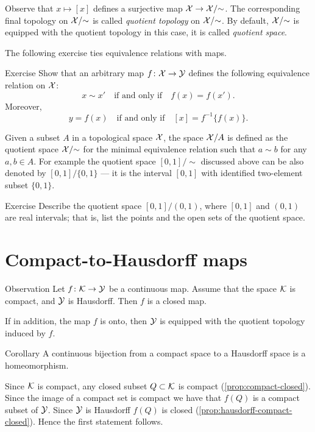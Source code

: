 Observe that $x\mapsto [x]$ defines a surjective map $\mathcal{X}\to \mathcal{X}/{\sim}$.
The corresponding final topology on $\mathcal{X}/{\sim}$ is called \emph{quotient topology} on $\mathcal{X}/{\sim}$.
By default, $\mathcal{X}/{\sim}$ is equipped with the quotient topology
in this case, it is called \emph{quotient space}.

The following exercise ties equivalence relations with maps.

\begin{thm}{Exercise}\label{ex:eq-relation-f}
Show that an arbitrary map $f\colon\mathcal{X}\to \mathcal{Y}$ defines the following equivalence relation on $\mathcal{X}$:
\[x\sim x'\quad\text{if and only if}\quad f(x)=f(x').\]
Moreover,
\[y=f(x)\quad\text{if and only if}\quad [x]=f^{-1}\{f(x)\}.\]
\end{thm}

Given a subset $A$ in a topological space $\mathcal{X}$, the space $\mathcal{X}/A$ is defined as the quotient space $\mathcal{X}/{\sim}$ for the minimal equivalence relation such that $a\sim b$ for any $a,b\in A$.
For example the quotient space $[0,1]/{\sim}$ discussed above can be also denoted by $[0,1]/\{0,1\}$ --- it is the interval $[0,1]$ with identified two-element subset $\{0,1\}$.

\begin{thm}{Exercise}\label{ex:[0,1]/(0,1)}
Describe the quotient space $[0,1]/(0,1)$, where $[0,1]$ and $(0,1)$ are real intervals;
that is, list the points and the open sets of the quotient space.
\end{thm}

\section{Compact-to-Hausdorff maps}

\begin{thm}{Observation}\label{obs:compact-to-hausdorff}
Let $f\colon\mathcal{K}\to\mathcal{Y}$ be a continuous map.
Assume that the space $\mathcal{K}$ is compact, and $\mathcal{Y}$ is Hausdorff.
Then $f$ is a closed map.

If in addition, the map $f$ is onto, then $\mathcal{Y}$ is equipped with the quotient topology induced by $f$. 
\end{thm}

\begin{thm}{Corollary}
A continuous bijection from a compact space to a Hausdorff space is a homeomorphism.
\end{thm}


Since $\mathcal{K}$ is compact, any closed subset $Q\subset \mathcal{K}$ is compact (\ref{prop:compact-closed}).
Since the image of a compact set is compact we have that $f(Q)$ is a compact subset of $\mathcal{Y}$.
Since $\mathcal{Y}$ is Hausdorff $f(Q)$ is closed (\ref{prop:hausdorff-compact-closed}).
Hence the first statement follows.

